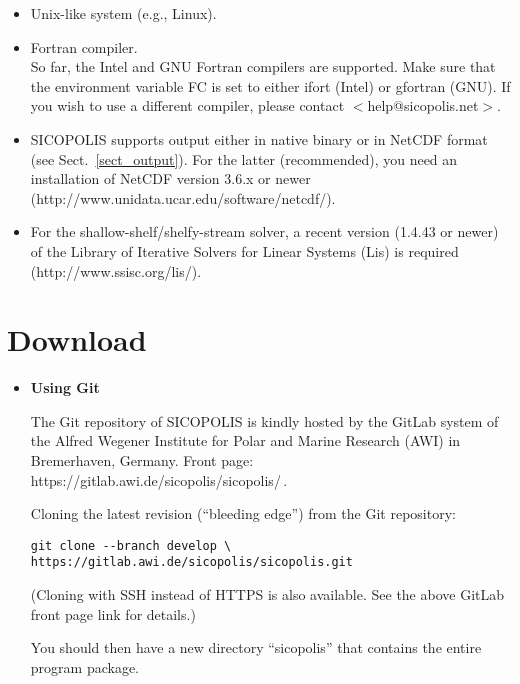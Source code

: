 \documentclass[12pt,a4paper]{article}
\begin{document}
\begin{itemize}

\item Unix-like system (e.g., Linux).

\item Fortran compiler.
\\
So far, the Intel and GNU Fortran compilers are supported. Make sure that the environment variable FC is set to either ifort (Intel) or gfortran (GNU). If you wish to use a different compiler, please contact $<$help@sicopolis.net$>$.

\item SICOPOLIS supports output either in native binary or in NetCDF format (see Sect.~\ref{sect_output}). For the latter (recommended), you need an installation of NetCDF version 3.6.x or newer (http://www.unidata.ucar.edu/software/netcdf/).

\item For the shallow-shelf/shelfy-stream solver, a recent version (1.4.43 or newer) of the Library of Iterative Solvers for Linear Systems (Lis) is required
\\
(http://www.ssisc.org/lis/).

\end{itemize}

\section{Download}

\begin{itemize}

\item \textbf{Using Git}

The Git repository of SICOPOLIS is kindly hosted by the GitLab system of the Alfred Wegener Institute for Polar and Marine Research (AWI) in Bremerhaven, Germany. Front page: https://gitlab.awi.de/sicopolis/sicopolis/\,.

Cloning the latest revision (``bleeding edge'') from the Git repository:

\hspace*{1.5em}\verb+git clone --branch develop \+
\\[-1ex]
\hspace*{3.65em}\verb+https://gitlab.awi.de/sicopolis/sicopolis.git+

(Cloning with SSH instead of HTTPS is also available. See the above GitLab front page link for details.)

You should then have a new directory ``sicopolis'' that contains the entire program package.

\end{itemize}
\end{document}
